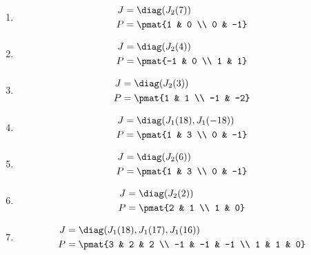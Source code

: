\begin{enumerate}
\item

\begin{align*}
J &= \diag(J_{2}(7))\\
P &= \pmat{1 & 0 \\ 0 & -1}
\end{align*}

\item

\begin{align*}
J &= \diag(J_{2}(4))\\
P &= \pmat{-1 & 0 \\ 1 & 1}
\end{align*}

\item

\begin{align*}
J &= \diag(J_{2}(3))\\
P &= \pmat{1 & 1 \\ -1 & -2}
\end{align*}

\item

\begin{align*}
J &= \diag(J_{1}(18), J_{1}(-18))\\
P &= \pmat{1 & 3 \\ 0 & -1}
\end{align*}

\item

\begin{align*}
J &= \diag(J_{2}(6))\\
P &= \pmat{1 & 3 \\ 0 & -1}
\end{align*}

\item

\begin{align*}
J &= \diag(J_{2}(2))\\
P &= \pmat{2 & 1 \\ 1 & 0}
\end{align*}

\item

\begin{align*}
J &= \diag(J_{1}(18), J_{1}(17), J_{1}(16))\\
P &= \pmat{3 & 2 & 2 \\ -1 & -1 & -1 \\ 1 & 1 & 0}
\end{align*}


\end{enumerate}
